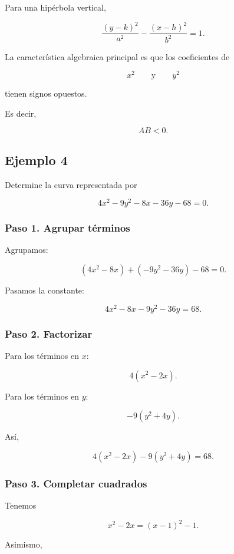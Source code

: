 \documentclass[12pt]{article}
\begin{document}
Para una hipérbola vertical,

\[
\boxed{
\frac{(y-k)^2}{a^2}
-
\frac{(x-h)^2}{b^2}
=1.
}
\]

La característica algebraica principal es que los coeficientes de

\[
x^2
\qquad\text{y}\qquad
y^2
\]

tienen signos opuestos.

Es decir,

\[
\boxed{
AB<0.
}
\]

\subsection*{Ejemplo 4}

Determine la curva representada por

\[
4x^2-9y^2-8x-36y-68=0.
\]

\subsubsection*{Paso 1. Agrupar términos}

Agrupamos:

\[
(4x^2-8x)+(-9y^2-36y)-68=0.
\]

Pasamos la constante:

\[
4x^2-8x-9y^2-36y=68.
\]

\subsubsection*{Paso 2. Factorizar}

Para los términos en \(x\):

\[
4(x^2-2x).
\]

Para los términos en \(y\):

\[
-9(y^2+4y).
\]

Así,

\[
4(x^2-2x)-9(y^2+4y)=68.
\]

\subsubsection*{Paso 3. Completar cuadrados}

Tenemos

\[
x^2-2x
=
(x-1)^2-1.
\]

Asimismo,
\end{document}
